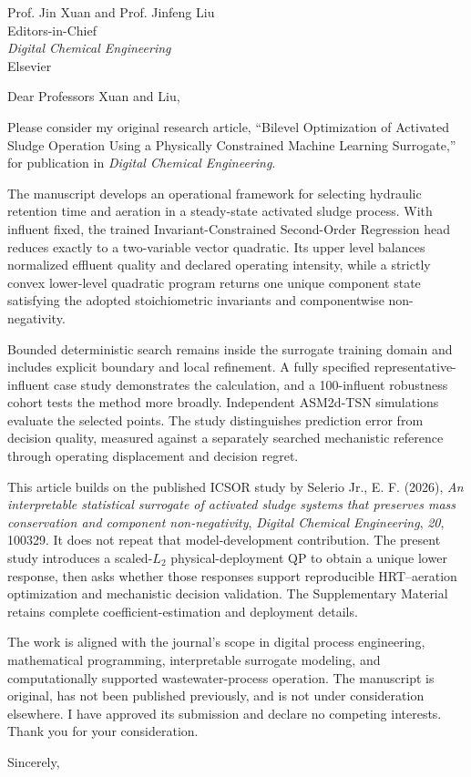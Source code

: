 \documentclass[11pt]{letter}
\date{\today}
\begin{document}
\begin{letter}{Prof. Jin Xuan and Prof. Jinfeng Liu\\
Editors-in-Chief\\
\textit{Digital Chemical Engineering}\\
Elsevier}

\opening{Dear Professors Xuan and Liu,}

Please consider my original research article, ``Bilevel Optimization of Activated Sludge Operation Using a Physically Constrained Machine Learning Surrogate,'' for publication in \textit{Digital Chemical Engineering}.

The manuscript develops an operational framework for selecting hydraulic retention time and aeration in a steady-state activated sludge process. With influent fixed, the trained Invariant-Constrained Second-Order Regression head reduces exactly to a two-variable vector quadratic. Its upper level balances normalized effluent quality and declared operating intensity, while a strictly convex lower-level quadratic program returns one unique component state satisfying the adopted stoichiometric invariants and componentwise non-negativity.

Bounded deterministic search remains inside the surrogate training domain and includes explicit boundary and local refinement. A fully specified representative-influent case study demonstrates the calculation, and a 100-influent robustness cohort tests the method more broadly. Independent ASM2d-TSN simulations evaluate the selected points. The study distinguishes prediction error from decision quality, measured against a separately searched mechanistic reference through operating displacement and decision regret.

This article builds on the published ICSOR study by Selerio Jr., E. F. (2026), \emph{An interpretable statistical surrogate of activated sludge systems that preserves mass conservation and component non-negativity}, \textit{Digital Chemical Engineering}, \textit{20}, 100329. It does not repeat that model-development contribution. The present study introduces a scaled-$L_2$ physical-deployment QP to obtain a unique lower response, then asks whether those responses support reproducible HRT--aeration optimization and mechanistic decision validation. The Supplementary Material retains complete coefficient-estimation and deployment details.

The work is aligned with the journal's scope in digital process engineering, mathematical programming, interpretable surrogate modeling, and computationally supported wastewater-process operation. The manuscript is original, has not been published previously, and is not under consideration elsewhere. I have approved its submission and declare no competing interests. Thank you for your consideration.

\closing{Sincerely,}

\end{letter}
\end{document}
